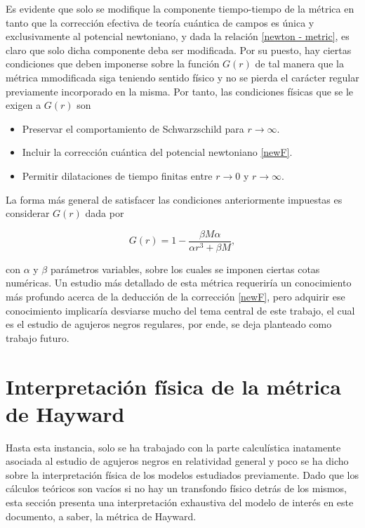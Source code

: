 \documentclass[16pt,a4paper]{article}
\numberwithin{equation}{section}
\theoremstyle{definition}
\begin{document}
Es evidente que solo se modifique la componente tiempo-tiempo de la métrica en tanto que la corrección efectiva de teoría cuántica de campos es única y exclusivamente al  potencial newtoniano, y dada la relación \eqref{newton - metric}, es claro que solo dicha componente deba ser modificada. Por su puesto, hay ciertas condiciones que deben imponerse sobre la función $G(r)$ de tal manera que la métrica mmodificada siga teniendo sentido físico y no se pierda el carácter regular previamente incorporado en la misma. Por tanto, las condiciones físicas que se le exigen a $G(r)$ son
\begin{itemize}
\item Preservar el comportamiento de Schwarzschild para $r \to \infty$.
\item Incluir la corrección cuántica del potencial newtoniano \eqref{newF}.
\item Permitir dilataciones de tiempo finitas entre $r \to 0$ y $r \to \infty$.
\end{itemize}

La forma más general de satisfacer las condiciones anteriormente impuestas es considerar $G(r)$ dada por

\begin{equation}
\label{mod-hay-g}
G(r) = 1 - \frac{\beta M \alpha}{\alpha r^3 + \beta M},
\end{equation}

con $\alpha$ y $\beta$ parámetros variables, sobre los cuales se imponen ciertas cotas numéricas. Un estudio más detallado de esta métrica requeriría un conocimiento más profundo acerca de la deducción de la corrección \eqref{newF}, pero adquirir ese conocimiento implicaría desviarse mucho del tema central de este trabajo, el cual es el estudio de agujeros negros regulares, por ende, se deja planteado como trabajo futuro.

\newpage
\section{\label{phys. int.} Interpretación física de la métrica de Hayward}

Hasta esta instancia, solo se ha trabajado con la parte calculística inatamente asociada al estudio de agujeros negros en relatividad general y poco se ha dicho sobre la interpretación física de los modelos estudiados previamente. Dado que los cálculos teóricos son vacíos si no hay un transfondo físico detrás de los mismos, esta sección presenta una interpretación exhaustiva del modelo de interés en este documento, a saber, la métrica de Hayward.\\
\end{document}
